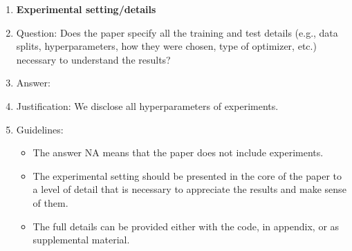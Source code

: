 \documentclass{article}
\theoremstyle{plain}
\begin{document}
\begin{enumerate}
\item {\bf Experimental setting/details}
    \item[] Question: Does the paper specify all the training and test details (e.g., data splits, hyperparameters, how they were chosen, type of optimizer, etc.) necessary to understand the results?
    \item[] Answer: \answerYes{}
    \item[] Justification:  We disclose all hyperparameters of experiments.
    \item[] Guidelines:
    \begin{itemize}
        \item The answer NA means that the paper does not include experiments.
        \item The experimental setting should be presented in the core of the paper to a level of detail that is necessary to appreciate the results and make sense of them.
        \item The full details can be provided either with the code, in appendix, or as supplemental material.
    \end{itemize}


\end{enumerate}
\end{document}
